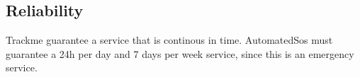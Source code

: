 \subsection{Reliability}
 Trackme guarantee a service that is continous in time.
AutomatedSos must guarantee a 24h per day and 7 days per week service, since this is an emergency service.

